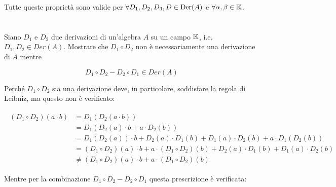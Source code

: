 Tutte queste proprietà sono valide per $ \forall D_{1}, D_{2}, D_{3}, D \in \operatorname{Der}(A) $ e $ \forall \alpha, \beta \in \mathbb{K} $.

%

\newpage

%

\section{}\label{es1-11}

\begin{tcolorbox}
	Siano $ D_{1} $ e $ D_{2} $ due derivazioni di un'algebra $ A $ su un campo $ \mathbb{K} $, i.e. $ D_{1},D_{2} \in Der(A) $. Mostrare che $ D_{1} \circ D_{2} $ non è necessariamente una derivazione di $ A $ mentre
	
	\begin{equation}
		D_{1} \circ D_{2} - D_{2} \circ D_{1} \in Der(A)
	\end{equation}
\end{tcolorbox}

Perché $ D_{1} \circ D_{2} $ sia una derivazione deve, in particolare, soddisfare la regola di Leibniz, ma questo non è verificato:

\begin{align}
	\begin{split}
		(D_{1} \circ D_{2})(a \cdot b) &= D_{1}(D_{2}(a \cdot b))\\
		&= D_{1}( D_{2}(a) \cdot b + a \cdot D_{2}(b) )\\
		&= D_{1}(D_{2}(a)) \cdot b + D_{2}(a) \cdot D_{1}(b) + D_{1}(a) \cdot D_{2}(b) + a \cdot D_{1}(D_{2}(b))\\
		&= (D_{1} \circ D_{2})(a) \cdot b + a \cdot (D_{1} \circ D_{2})(b) + D_{2}(a) \cdot D_{1}(b) + D_{1}(a) \cdot D_{2}(b)\\
		&\neq (D_{1} \circ D_{2})(a) \cdot b + a \cdot (D_{1} \circ D_{2})(b)
	\end{split}
\end{align}

Mentre per la combinazione $ D_{1} \circ D_{2} - D_{2} \circ D_{1} $ questa prescrizione è verificata:

